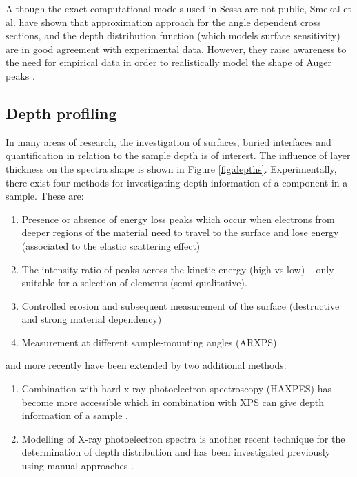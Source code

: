 Although the exact computational models used in Sessa are not public, Smekal et al. have shown that approximation approach for the angle dependent cross sections, and the depth distribution function (which models surface sensitivity) are in good agreement with experimental data. However, they raise awareness to the need for empirical data in order to realistically model the shape of Auger peaks \cite{smekal_simulation_2005}. 

\subsection{Depth profiling}
In many areas of research, the investigation of surfaces, buried interfaces and quantification in relation to the sample depth is of interest. The influence of layer thickness on the spectra shape is shown in Figure \ref{fig:depths}. Experimentally, there exist four methods for investigating depth-information of a component in a sample. These are:
\begin{enumerate}
    \item Presence or absence of energy loss peaks which occur when electrons from deeper regions of the material need to travel to the surface and lose energy (associated to the elastic scattering effect)
    \item The intensity ratio of peaks across the kinetic energy (high vs low) – only suitable for a selection of elements (semi-qualitative).
    \item Controlled erosion and subsequent measurement of the surface (destructive and strong material dependency)
    \item Measurement at different sample-mounting angles (ARXPS). \cite{moulder_handbook_1992} 
    \end{enumerate}
and more recently have been extended by two additional methods:
\begin{enumerate}[resume]
    \item Combination with hard x-ray photoelectron spectroscopy (HAXPES) has become more accessible which in combination with XPS can give depth information of a sample \cite{zborowski_improved_2022}.
    \item Modelling of X-ray photoelectron spectra is another recent technique for the determination of depth distribution and has been investigated previously using manual approaches \cite{zborowski_comparison_2022}.

\end{enumerate}


